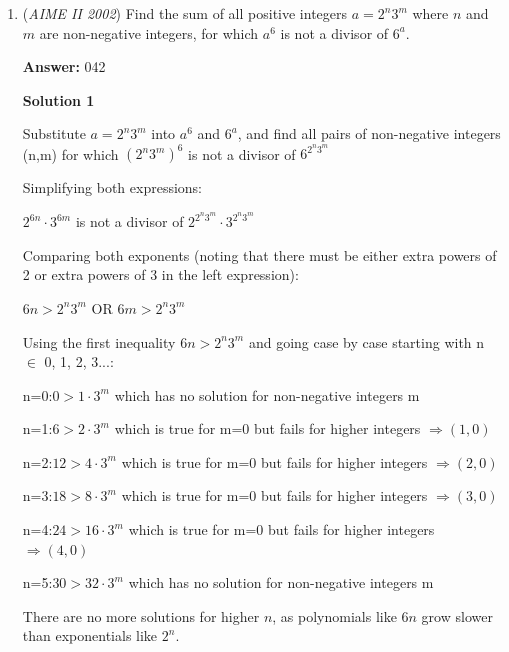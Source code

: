 \begin{enumerate}
 Now, we need to account for the areas of the vertex hexagons. The segments create 90 degree angles on 2 sides of the hexagon, creating 2 30 60 90 right triangles (leg 1/2, √3/2 and 1 equilateral triangle (side length 1). 

 
So, the sum of the vertex hexagon areas are 6 * ((1\textasciicircum{}2 * √3/4) +√3/8 + √3/8). Hence, having the 2nd and 3rd expressions subtracted from the first, we get 361803 * √3/2, so the remainder is 803.

 


	\item (\textit{AIME II 2002}) Find the sum of all positive integers $a=2^n3^m$ where $n$ and $m$ are non-negative integers, for which $a^6$ is not a divisor of $6^a$.


 
 \textbf{Answer: }042



\textbf{Solution 1}

Substitute $a=2^n3^m$ into $a^6$ and $6^a$, and find all pairs of non-negative integers (n,m) for which $(2^n3^m)^{6}$ is not a divisor of $6^{2^n3^m}$

 Simplifying both expressions:

 $2^{6n} \cdot 3^{6m}$ is not a divisor of $2^{2^n3^m} \cdot 3^{2^n3^m}$

 Comparing both exponents (noting that there must be either extra powers of 2 or extra powers of 3 in the left expression):

 $6n > 2^n3^m$  OR  $6m > 2^n3^m$

 
Using the first inequality $6n > 2^n3^m$ and going case by case starting with n $\in$ {0, 1, 2, 3...}:

 n=0:$0>1 \cdot 3^m$ which has no solution for non-negative integers m 

 n=1:$6 > 2 \cdot 3^m$ which is true for m=0 but fails for higher integers $\Rightarrow (1,0)$

 n=2:$12 > 4 \cdot 3^m$ which is true for m=0 but fails for higher integers $\Rightarrow (2,0)$

 n=3:$18 > 8 \cdot 3^m$ which is true for m=0 but fails for higher integers $\Rightarrow (3,0)$

 n=4:$24 > 16 \cdot 3^m$ which is true for m=0 but fails for higher integers $\Rightarrow (4,0)$

 n=5:$30 > 32 \cdot 3^m$ which has no solution for non-negative integers m 

 There are no more solutions for higher $n$, as polynomials like $6n$ grow slower than exponentials like $2^n$.


\end{enumerate}
